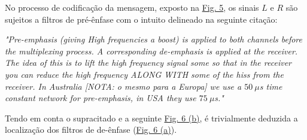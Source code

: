 No processo de codificação da mensagem, exposto na \hyperref[fig:stereo_encoder]{Fig. 5}, os sinais $L$ e $R$ são sujeitos a filtros de pré-ênfase com o intuito delineado na seguinte citação:

\textit{"Pre-emphasis (giving High frequencies a boost) is applied to both channels before the multiplexing process. A corresponding de-emphasis is applied at the receiver. The idea of this is to lift the high frequency signal some so that in the receiver you can reduce the high frequency ALONG WITH some of the hiss from the receiver. In Australia [NOTA: o mesmo para a Europa\cite{transmission_standards_for_fm_sound_broadcasting_at_vhf}] we use a $50\ \mu$s time constant network for pre-emphasis, in USA they use $75\ \mu$s."}\cite{anintroductiontofmmpx}

\vspace{1.0em}
Tendo em conta o supracitado e a seguinte \hyperref[fig:bb]{Fig. 6 (b)}, é trivialmente deduzida a localização dos filtros de de-ênfase (\hyperref[fig:aa]{Fig. 6 (a)}).

